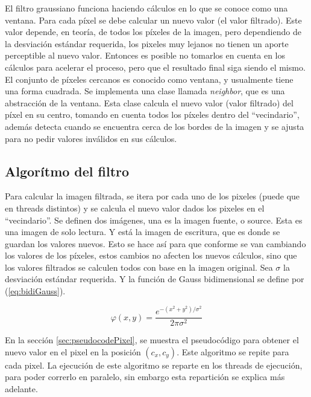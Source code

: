 \documentclass {article}
\begin{document}
El filtro graussiano funciona haciendo cálculos en lo que se conoce como una ventana. Para cada
píxel se debe calcular un nuevo valor (el valor filtrado). Este valor depende, en teoría, de todos
los píxeles de la imagen, pero dependiendo de la desviación estándar requerida, los pixeles muy
lejanos no tienen un aporte perceptible al nuevo valor. Entonces es posible no tomarlos en cuenta en
los cálculos para acelerar el proceso, pero que el resultado final siga siendo el mismo. El conjunto
de píxeles cercanos es conocido como ventana, y usualmente tiene una forma cuadrada. Se implementa
una clase llamada \textit{neighbor}, que es una abstracción de la ventana. Esta clase calcula el
nuevo valor (valor filtrado) del píxel en su centro, tomando en cuenta todos los píxeles dentro del
``vecindario'', además detecta cuando
se encuentra cerca de los bordes de la imagen y se ajusta para no pedir valores inválidos en sus
cálculos.

\subsection{Algorítmo del filtro}

Para calcular la imagen filtrada, se itera por cada uno de los pixeles (puede que en threads
distintos) y se calcula el nuevo valor dados los pixeles en el ``vecindario''. Se definen dos
imágenes, una es la imagen fuente, o source. Esta es una imagen de solo lectura. Y está la imagen de
escritura, que es donde se guardan los valores nuevos. Esto se hace así para que conforme se van
cambiando los valores de los píxeles, estos cambios no afecten los nuevos cálculos, sino que los
valores filtrados se calculen todos con base en la imagen original. Sea $\sigma$ la desviación
estándar requerida. Y la función de Gauss bidimensional se define por (\ref{eq:bidiGauss}).

\begin{equation}
  \varphi (x, y)= \frac{e^{-(x^2+y^2)/\sigma^2}}{2\pi \sigma^2} 
  \label{eq:bidiGauss}
\end{equation}

En la sección \ref{sec:pseudocodePixel}, se muestra el pseudocódigo para obtener el nuevo valor en
el pixel en la posición $(c_x, c_y)$. Este algoritmo se repite para cada pixel. La ejecución de este
algoritmo se reparte en los threads de ejecución, para poder correrlo en paralelo, sin embargo esta
repartición  se explica más adelante.
\end{document}
